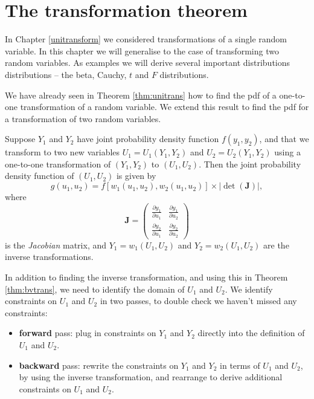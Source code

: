 \documentclass[]{book}
\providecommand{\tightlist}{%
  \setlength{\itemsep}{0pt}\setlength{\parskip}{0pt}}
\theoremstyle{definition}
\theoremstyle{definition}
\theoremstyle{definition}
\theoremstyle{remark}
\let\BeginKnitrBlock\begin \let\EndKnitrBlock\end
\begin{document}
\section{The transformation theorem}\label{the-transformation-theorem}

In Chapter \ref{unitransform} we considered transformations of a single
random variable. In this chapter we will generalise to the case of
transforming two random variables. As examples we will derive several
important distributions distributions -- the beta, Cauchy, \(t\) and
\(F\) distributions.

We have already seen in Theorem \ref{thm:unitrans} how to find the pdf
of a one-to-one transformation of a random variable. We extend this
result to find the pdf for a transformation of two random variables.

\BeginKnitrBlock{theorem}
\protect\hypertarget{thm:bvtrans}{}{\label{thm:bvtrans} }Suppose \(Y_1\) and
\(Y_2\) have joint probability density function \(f(y_1, y_2)\), and
that we transform to two new variables \(U_1 = U_1(Y_1, Y_2)\) and
\(U_2 = U_2(Y_1, Y_2)\) using a one-to-one transformation of
\((Y_1 , Y_2)\) to \((U_1, U_2)\). Then the joint probability density
function of \((U_1, U_2)\) is given by
\[g(u_1 , u_2)  = f[w_1(u_1, u_2), w_2(u_1 , u_2)] \times \big|\det (\bm J)\big|,\]
where \[ \bm{J} = 
\begin{pmatrix}
\frac{\partial y_1}{\partial u_1} & \frac{\partial y_1}{\partial u_2} \\
\frac{\partial y_2}{\partial u_1} & \frac{\partial y_2}{\partial u_2}
\end{pmatrix}
\] is the \emph{Jacobian} matrix, and \(Y_1 = w_1(U_1, U_2)\) and
\(Y_2 = w_2(U_1, U_2)\) are the inverse transformations.
\EndKnitrBlock{theorem}

In addition to finding the inverse transformation, and using this in
Theorem \ref{thm:bvtrans}, we need to identify the domain of \(U_1\) and
\(U_2\). We identify constraints on \(U_1\) and \(U_2\) in two passes,
to double check we haven't missed any constraints:

\begin{itemize}
\tightlist
\item
  \textbf{forward} pass: plug in constraints on \(Y_1\) and \(Y_2\)
  directly into the definition of \(U_1\) and \(U_2\).
\item
  \textbf{backward} pass: rewrite the constraints on \(Y_1\) and \(Y_2\)
  in terms of \(U_1\) and \(U_2\), by using the inverse transformation,
  and rearrange to derive additional constraints on \(U_1\) and \(U_2\).
\end{itemize}
\end{document}
